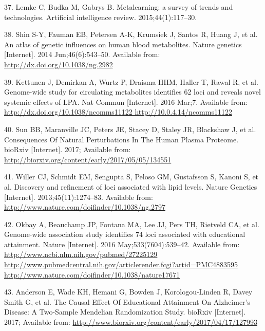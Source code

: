 \documentclass[]{article}
\begin{document}
\hypertarget{ref-lemke2015metalearning}{}
37. Lemke C, Budka M, Gabrys B. Metalearning: a survey of trends and
technologies. Artificial intelligence review. 2015;44(1):117--30.

\hypertarget{ref-Shin2014}{}
38. Shin S-Y, Fauman EB, Petersen A-K, Krumsiek J, Santos R, Huang J, et
al. An atlas of genetic influences on human blood metabolites. Nature
genetics {[}Internet{]}. 2014 Jun;46(6):543--50. Available from:
\url{http://dx.doi.org/10.1038/ng.2982}

\hypertarget{ref-Kettunen2016}{}
39. Kettunen J, Demirkan A, Wurtz P, Draisma HHM, Haller T, Rawal R, et
al. Genome-wide study for circulating metabolites identifies 62 loci and
reveals novel systemic effects of LPA. Nat Commun {[}Internet{]}. 2016
Mar;7. Available from:
\href{http://dx.doi.org/10.1038/ncomms11122\%20http://10.0.4.14/ncomms11122}{http://dx.doi.org/10.1038/ncomms11122 http://10.0.4.14/ncomms11122}

\hypertarget{ref-Sun2017}{}
40. Sun BB, Maranville JC, Peters JE, Stacey D, Staley JR, Blackshaw J,
et al. Consequences Of Natural Perturbations In The Human Plasma
Proteome. bioRxiv {[}Internet{]}. 2017; Available from:
\url{http://biorxiv.org/content/early/2017/05/05/134551}

\hypertarget{ref-Willer2013}{}
41. Willer CJ, Schmidt EM, Sengupta S, Peloso GM, Gustafsson S, Kanoni
S, et al. Discovery and refinement of loci associated with lipid levels.
Nature Genetics {[}Internet{]}. 2013;45(11):1274--83. Available from:
\url{http://www.nature.com/doifinder/10.1038/ng.2797}

\hypertarget{ref-Okbay2016}{}
42. Okbay A, Beauchamp JP, Fontana MA, Lee JJ, Pers TH, Rietveld CA, et
al. Genome-wide association study identifies 74 loci associated with
educational attainment. Nature {[}Internet{]}. 2016
May;533(7604):539--42. Available from:
\href{http://www.ncbi.nlm.nih.gov/pubmed/27225129\%20http://www.pubmedcentral.nih.gov/articlerender.fcgi?artid=PMC4883595\%20http://www.nature.com/doifinder/10.1038/nature17671}{http://www.ncbi.nlm.nih.gov/pubmed/27225129 http://www.pubmedcentral.nih.gov/articlerender.fcgi?artid=PMC4883595 http://www.nature.com/doifinder/10.1038/nature17671}

\hypertarget{ref-Anderson2017}{}
43. Anderson E, Wade KH, Hemani G, Bowden J, Korologou-Linden R, Davey
Smith G, et al. The Causal Effect Of Educational Attainment On
Alzheimer's Disease: A Two-Sample Mendelian Randomization Study. bioRxiv
{[}Internet{]}. 2017; Available from:
\url{http://www.biorxiv.org/content/early/2017/04/17/127993}
\end{document}
